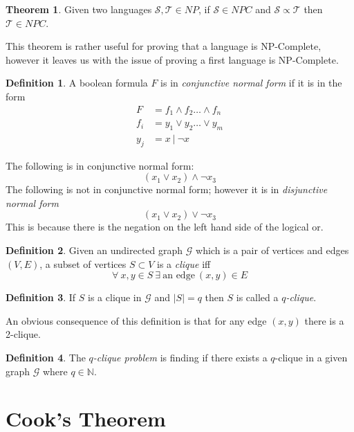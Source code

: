 \documentclass{article}
\theoremstyle{definition}
\newtheorem{definition}{Definition}[section]
\newtheorem{theorem}{Theorem}[section]
\begin{document}
\begin{theorem}
	Given two languages $\mathcal{S}, \mathcal{T} \in NP$,
	if $\mathcal{S} \in NPC$ and $\mathcal{S} \propto \mathcal{T}$ then
	$\mathcal{T} \in NPC$.
\end{theorem}

This theorem is rather useful for proving that a language is NP-Complete,
however it leaves us with the issue of proving a first language is NP-Complete.

\begin{definition}
	A boolean formula $F$ is in \textit{conjunctive normal form} if it is in the form
	\begin{equation}
	\begin{split}
		F &= f_1 \land f_2 \dots \land f_n \\
		f_i &= y_1 \lor y_2 \dots \lor y_m \\
		y_j &= x\ |\ \neg x
	\end{split}
	\end{equation}
\end{definition}

The following is in conjunctive normal form:
$$(x_1 \lor x_2) \land \neg x_3$$
The following is not in conjunctive normal form;
however it is in \textit{disjunctive normal form}
$$(x_1 \lor x_2) \lor \neg x_3$$
This is because there is the negation on the left hand side of the logical or.

\begin{definition}
	Given an undirected graph $\mathcal{G}$ which is a pair of vertices and edges $(V,E)$,
	a subset of vertices $S \subset V$ is a \textit{clique} iff
	$$\forall\ x, y \in S\ \exists\ \textrm{an edge}\ (x,y) \in E$$
\end{definition}

\begin{definition}
	If $S$ is a clique in $\mathcal{G}$ and $|S| = q$ then $S$ is called a \textit{$q$-clique}.
\end{definition}

An obvious consequence of this definition is that for any edge $(x,y)$ there is a 2-clique.

\begin{definition}
	The \textit{$q$-clique problem} is finding if there exists a $q$-clique in a given graph
	$\mathcal{G}$ where $q \in \mathbb{N}$.
\end{definition}

\pagebreak
\section{Cook’s Theorem}
\end{document}
